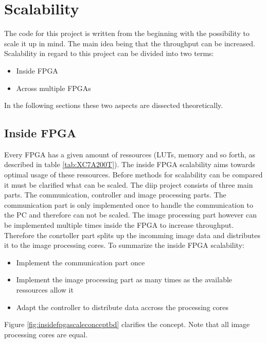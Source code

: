 %
%
\chapter{Scalability} \label{chapt:scalability}
The code for this project is written from the beginning with the possibility to
scale it up in mind. The main idea being that the throughput can be increased.
Scalability in regard to this project can be divided into two terms:
\begin{itemize}
    \item Inside FPGA
    \item Across multiple FPGAs
\end{itemize}

In the following sections these two aspects are dissected theoretically.

\section{Inside FPGA} \label{chapt:sca:inside}
Every FPGA has a given amount of ressources (LUTs, memory and so forth, as
described in table \ref{tab:XC7A200T}). The inside FPGA scalability aims towards
optimal usage of these ressources. Before methods for scalability can be
compared it must be clarified what can be scaled. The \gls{diip} project
consists of three main parts. The communication, controller and image processing
parts. The communication part is only implemented once to handle the
communication to the PC and therefore can not be scaled. The image processing
part however can be implemented multiple times inside the FPGA to increase
throughput. Therefore the conrtoller part splits up the incomming image data and
distributes it to the image processing cores. To summarize the inside FPGA
scalability:
\begin{itemize}
    \item Implement the communication part once
    \item Implement the image processing part as many times as the available
    ressources allow it
    \item Adapt the controller to distribute data accross the processing cores
\end{itemize}

Figure \ref{fig:insidefpgascaleconceptbd} clarifies the concept. Note that all
image processing cores are equal.

